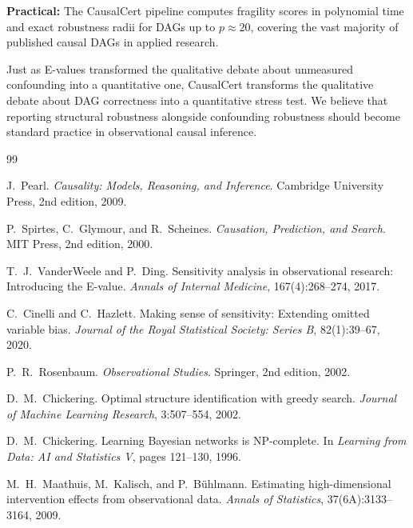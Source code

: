 \documentclass[11pt,a4paper]{article}
\theoremstyle{definition}
\theoremstyle{remark}
\begin{document}
\textbf{Practical:} The CausalCert pipeline computes fragility scores in polynomial
time and exact robustness radii for DAGs up to $p \approx 20$, covering the vast
majority of published causal DAGs in applied research.

Just as E-values transformed the qualitative debate about unmeasured confounding into
a quantitative one, CausalCert transforms the qualitative debate about DAG correctness
into a quantitative stress test. We believe that reporting structural robustness
alongside confounding robustness should become standard practice in observational
causal inference.

\begin{thebibliography}{99}

J.~Pearl.
\newblock \emph{Causality: Models, Reasoning, and Inference}.
\newblock Cambridge University Press, 2nd edition, 2009.

P.~Spirtes, C.~Glymour, and R.~Scheines.
\newblock \emph{Causation, Prediction, and Search}.
\newblock MIT Press, 2nd edition, 2000.

T.~J.~VanderWeele and P.~Ding.
\newblock Sensitivity analysis in observational research: Introducing the
  E-value.
\newblock \emph{Annals of Internal Medicine}, 167(4):268--274, 2017.

C.~Cinelli and C.~Hazlett.
\newblock Making sense of sensitivity: Extending omitted variable bias.
\newblock \emph{Journal of the Royal Statistical Society: Series B},
  82(1):39--67, 2020.

P.~R.~Rosenbaum.
\newblock \emph{Observational Studies}.
\newblock Springer, 2nd edition, 2002.

D.~M.~Chickering.
\newblock Optimal structure identification with greedy search.
\newblock \emph{Journal of Machine Learning Research}, 3:507--554, 2002.

D.~M.~Chickering.
\newblock Learning Bayesian networks is NP-complete.
\newblock In \emph{Learning from Data: AI and Statistics V}, pages 121--130,
  1996.

M.~H.~Maathuis, M.~Kalisch, and P.~B\"uhlmann.
\newblock Estimating high-dimensional intervention effects from observational
  data.
\newblock \emph{Annals of Statistics}, 37(6A):3133--3164, 2009.


\end{thebibliography}
\end{document}
